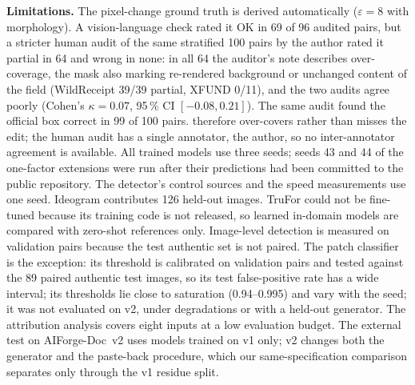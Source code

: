 \textbf{Limitations.} The pixel-change ground truth is derived automatically ($\varepsilon{=}8$ with morphology). A vision-language check rated it OK in 69 of 96 audited pairs, but a stricter human audit of the same stratified 100 pairs by the author rated it partial in 64 and wrong in none: in all 64 the auditor's note describes over-coverage, the mask also marking re-rendered background or unchanged content of the field (WildReceipt 39/39 partial, XFUND 0/11), and the two audits agree poorly (Cohen's $\kappa{=}0.07$, 95\,\% CI $[-0.08,0.21]$). The same audit found the official box correct in 99 of 100 pairs. \GTp{} therefore over-covers rather than misses the edit; the human audit has a single annotator, the author, so no inter-annotator agreement is available. All trained models use three seeds; seeds 43 and 44 of the one-factor extensions were run after their predictions had been committed to the public repository. The detector's control sources and the speed measurements use one seed. Ideogram contributes 126 held-out images. TruFor could not be fine-tuned because its training code is not released, so learned in-domain models are compared with zero-shot references only. Image-level detection is measured on validation pairs because the test authentic set is not paired. The patch classifier is the exception: its threshold is calibrated on validation pairs and tested against the 89 paired authentic test images, so its test false-positive rate has a wide interval; its thresholds lie close to saturation (0.94--0.995) and vary with the seed; it was not evaluated on v2, under degradations or with a held-out generator. The attribution analysis covers eight inputs at a low evaluation budget. The external test on AIForge-Doc~v2 uses models trained on v1 only; v2 changes both the generator and the paste-back procedure, which our same-specification comparison separates only through the v1 residue split.

